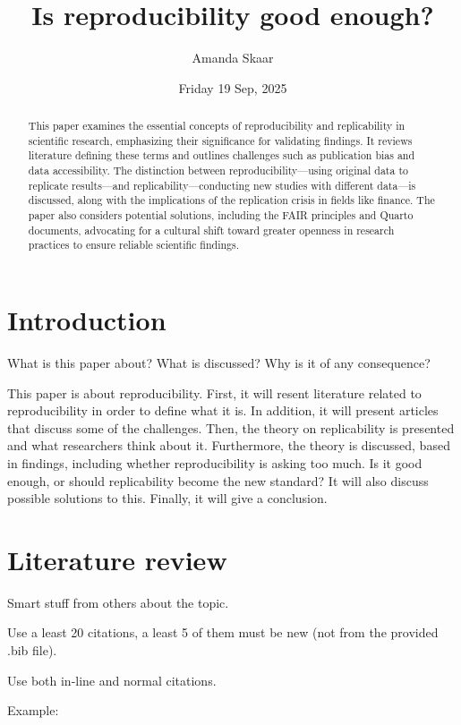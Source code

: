 \documentclass[
  a4paper,
]{article}
\title{Is reproducibility good enough?}
\author{Amanda Skaar}
\date{Friday 19 Sep, 2025}
\begin{document}
\maketitle
\begin{abstract}
This paper examines the essential concepts of reproducibility and
replicability in scientific research, emphasizing their significance for
validating findings. It reviews literature defining these terms and
outlines challenges such as publication bias and data accessibility. The
distinction between reproducibility---using original data to replicate
results---and replicability---conducting new studies with different
data---is discussed, along with the implications of the replication
crisis in fields like finance. The paper also considers potential
solutions, including the FAIR principles and Quarto documents,
advocating for a cultural shift toward greater openness in research
practices to ensure reliable scientific findings.
\end{abstract}


\section{Introduction}\label{introduction}

What is this paper about? What is discussed? Why is it of any
consequence?

This paper is about reproducibility. First, it will resent literature
related to reproducibility in order to define what it is. In addition,
it will present articles that discuss some of the challenges. Then, the
theory on replicability is presented and what researchers think about
it. Furthermore, the theory is discussed, based in findings, including
whether reproducibility is asking too much. Is it good enough, or should
replicability become the new standard? It will also discuss possible
solutions to this. Finally, it will give a conclusion.

\section{Literature review}\label{literature-review}

Smart stuff from others about the topic.

Use a least 20 citations, a least 5 of them must be new (not from the
provided .bib file).

Use both in-line and normal citations.

Example:
\end{document}
